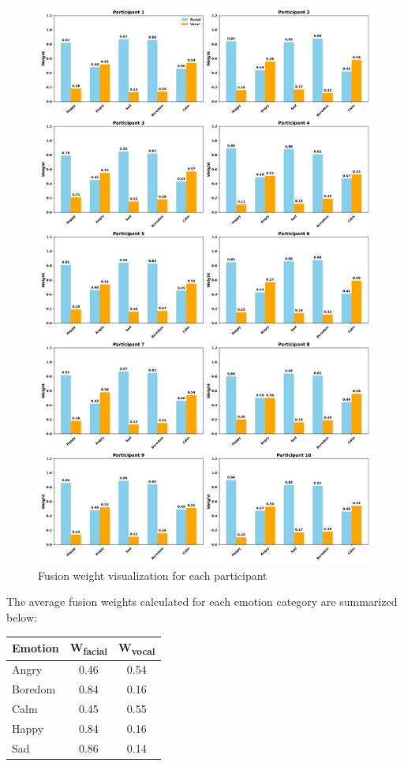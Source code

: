 \begin{figure}[H]
    \centering
    \includegraphics[width=1\textwidth]{img/chapter_04/weights/fusion_weights_visualization.png} 
    \caption{Fusion weight visualization for each participant}
    \label{fig:fusion-weights-visualization}
\end{figure}




The average fusion weights calculated for each emotion category are summarized below:

\begin{center}
\begin{tabular}{lcc}
\textbf{Emotion} & \textbf{W\textsubscript{facial}} & \textbf{W\textsubscript{vocal}} \\
\midrule
Angry   & 0.46 & 0.54 \\
Boredom & 0.84 & 0.16 \\
Calm    & 0.45 & 0.55 \\
Happy   & 0.84 & 0.16 \\
Sad     & 0.86 & 0.14 \\
\end{tabular}
\end{center}

